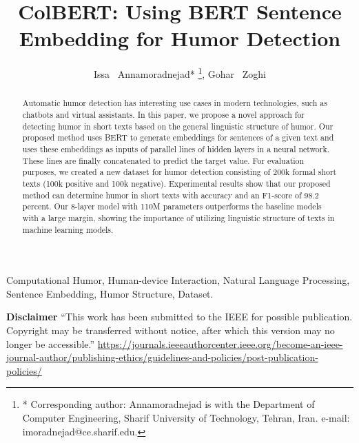 \documentclass[journal]{IEEEtran}
\begin{document}
\title{ColBERT: Using BERT Sentence Embedding for Humor Detection}


\author{Issa ~Annamoradnejad*
\thanks{* Corresponding author: Annamoradnejad is with the Department of Computer Engineering, Sharif University of Technology, Tehran, Iran. e-mail: imoradnejad@ce.sharif.edu.},
Gohar ~Zoghi
}

















\maketitle


\begin{abstract}
Automatic humor detection has interesting use cases in modern technologies, such as chatbots and virtual assistants. In this paper, we propose a novel approach for detecting humor in short texts based on the general linguistic structure of humor. Our proposed method uses BERT to generate embeddings for sentences of a given text and uses these embeddings as inputs of parallel lines of hidden layers in a neural network. These lines are finally concatenated to predict the target value. For evaluation purposes, we created a new dataset for humor detection consisting of 200k formal short texts (100k positive and 100k negative). Experimental results show that our proposed method can determine humor in short texts with accuracy and an F1-score of 98.2 percent. Our 8-layer model with 110M parameters outperforms the baseline models with a large margin, showing the importance of utilizing linguistic structure of texts in machine learning models.
\end{abstract}

\begin{IEEEkeywords}
Computational Humor, Human-device Interaction, Natural Language Processing, Sentence Embedding, Humor Structure, Dataset.
\end{IEEEkeywords}


\textbf{Disclaimer}
“This work has been submitted to the IEEE for possible publication. Copyright may be transferred without notice, after which this version may no longer be accessible.”
\url{https://journals.ieeeauthorcenter.ieee.org/become-an-ieee-journal-author/publishing-ethics/guidelines-and-policies/post-publication-policies/}
\end{document}
